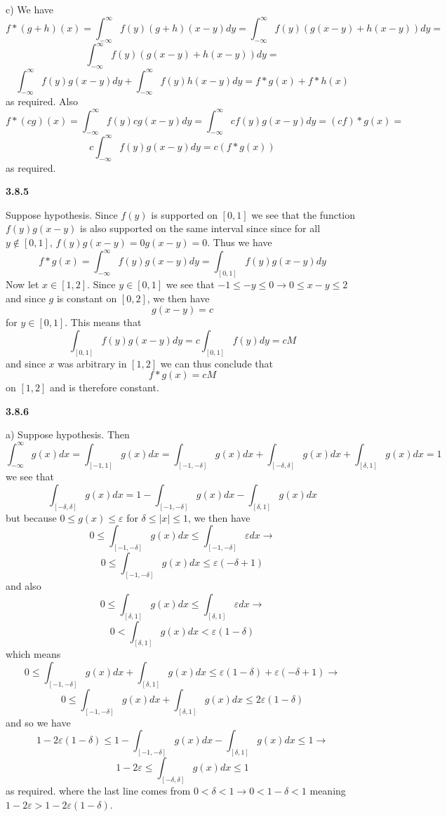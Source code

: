 \documentclass[12pt]{article}
\begin{document}
c) We have 
\[f*(g+h)(x) = \int_{-\infty}^\infty f(y)(g+h)(x-y)dy =\int_{-\infty}^\infty f(y)(g(x-y) +h(x-y))dy = \]
\[\int_{-\infty}^\infty f(y)(g(x-y) +h(x-y))dy =\]\[\int_{-\infty}^\infty f(y)g(x-y)dy +\int_{-\infty}^\infty f(y)h(x-y)dy = f*g(x) + f*h(x) \]
as required.
Also
\[f*(cg)(x)  =  \int_{-\infty}^\infty f(y)cg(x-y)dy =\int_{-\infty}^\infty cf(y)g(x-y)dy = (cf)*g(x) =   \]
\[c\int_{-\infty}^\infty f(y)g(x-y)dy = c(f*g(x))\] as required.

\textbf{3.8.5}

Suppose hypothesis. Since $f(y)$ is supported on $ [0,1]$ we see that the function $f(y)g(x-y)$ is also supported on the same interval since since for all $ y\notin[0,1]$, $f(y)g(x-y) = 0g(x-y)= 0$. Thus we have 
\[f*g(x) = \int_{-\infty}^\infty f(y)g(x-y)dy =\int_{[0,1]} f(y)g(x-y)dy\] Now let $ x\in [1,2]$. Since $y\in [0,1]$ we see that $ -1\leq -y\leq 0\rightarrow 0 \leq x-y\leq 2 $ and since $ g$ is constant on $[0,2]$, we then have 
\[g(x-y) = c\] for $ y\in [0,1]$. This means that 
\[\int_{[0,1]} f(y)g(x-y)dy = c\int_{[0,1]} f(y)dy = cM\] and since $x$ was arbitrary in $[1,2]$ we can thus conclude that 
\[f*g(x) = cM\] on $[1,2]$ and is therefore constant.

\textbf{3.8.6}

a) Suppose hypothesis. Then
\[\int_{-\infty}^\infty g(x)dx =\int_{[-1,1]} g(x)dx =\int_{[-1,-\delta]} g(x)dx + \int_{[-\delta,\delta]} g(x)dx +\int_{[\delta,1]} g(x)dx  =1 \] we see that 
\[ \int_{[-\delta,\delta]}g(x)dx =1 - \int_{[-1,-\delta]}g(x)dx -\int_{[\delta,1]} g(x)dx  \] but because $ 0\leq g(x) \leq \varepsilon$ for $ \delta \leq |x| \leq 1$, we then have
\[0\leq \int_{[-1,-\delta]} g(x)dx \leq\int_{[-1,-\delta]}\varepsilon dx\rightarrow\] \[0
\leq\int_{[-1,-\delta]} g(x)dx \leq\varepsilon(-\delta +1) \] and also 
\[0\leq \int_{[\delta,1]} g(x)dx \leq\int_{[\delta,1]}\varepsilon dx\rightarrow\] \[0
<\int_{[\delta,1]} g(x)dx <\varepsilon(1-\delta) \] which means
\[0 \leq\int_{[-1,-\delta]} g(x)dx+\int_{[\delta,1]} g(x)dx \leq \varepsilon(1-\delta)  +\varepsilon(-\delta +1)\rightarrow\]
\[0 \leq \int_{[-1,-\delta]} g(x)dx+\int_{[\delta,1]} g(x)dx \leq 2\varepsilon(1-\delta)\] and so we have 
\[1-2\varepsilon(1-\delta) \leq 1 - \int_{[-1,-\delta]} g(x)dx-\int_{[\delta,1]} g(x)dx \leq1 \rightarrow \]
\[1-2\varepsilon\leq\int_{[-\delta,\delta]}g(x) dx \leq 1\] as required. where the last line comes from 
$0<\delta < 1\rightarrow 0<1-\delta<1$ meaning $ 1-2\varepsilon > 1-2\varepsilon(1-\delta) $. 
\end{document}
